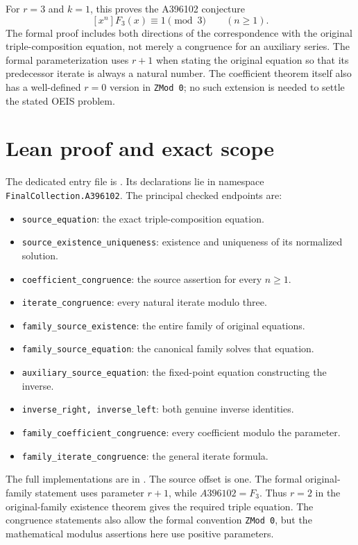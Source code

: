 \documentclass[11pt,a4paper]{article}
\theoremstyle{remark}
\begin{document}
For $r=3$ and $k=1$, this proves the A396102 conjecture
\[
[x^n]F_3(x)\equiv1\pmod3\qquad(n\ge1).
\]
The formal proof includes both directions of the correspondence with
the original triple-composition equation, not merely a congruence for
an auxiliary series. The formal parameterization uses $r+1$ when
stating the original equation so that its predecessor iterate is
always a natural number. The coefficient theorem itself also has a
well-defined $r=0$ version in \texttt{ZMod 0}; no such extension is
needed to settle the stated OEIS problem.

\section{Lean proof and exact scope}
The dedicated entry file is . Its declarations lie in namespace \texttt{FinalCollection.A396102}. The principal checked endpoints are:
\begin{itemize}[nosep]
\item \texttt{source\_equation}: the exact triple-composition equation.
\item \texttt{source\_existence\_uniqueness}: existence and uniqueness of its normalized solution.
\item \texttt{coefficient\_congruence}: the source assertion for every $n\ge1$.
\item \texttt{iterate\_congruence}: every natural iterate modulo three.
\item \texttt{family\_source\_existence}: the entire family of original equations.
\item \texttt{family\_source\_equation}: the canonical family solves that equation.
\item \texttt{auxiliary\_source\_equation}: the fixed-point equation constructing the inverse.
\item \texttt{inverse\_right, inverse\_left}: both genuine inverse identities.
\item \texttt{family\_coefficient\_congruence}: every coefficient modulo the parameter.
\item \texttt{family\_iterate\_congruence}: the general iterate formula.
\end{itemize}
The full implementations are in .
The source offset is one. The formal original-family statement uses parameter $r+1$, while $A396102=F_3$. Thus $r=2$ in the original-family existence theorem gives the required triple equation. The congruence statements also allow the formal convention \texttt{ZMod 0}, but the mathematical modulus assertions here use positive parameters.
\end{document}
